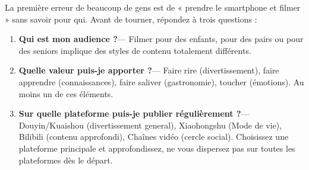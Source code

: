 


La première erreur de beaucoup de gens est de « prendre le smartphone et filmer » sans savoir pour qui. Avant de tourner, répondez à trois questions :

\begin{enumerate}
  \item \textbf{Qui est mon audience ?}— Filmer pour des enfants, pour des pairs ou pour des seniors implique des styles de contenu totalement différents.
  \item \textbf{Quelle valeur puis-je apporter ?}— Faire rire (divertissement), faire apprendre (connaissances), faire saliver (gastronomie), toucher (émotions). Au moins un de ces éléments.
  \item \textbf{Sur quelle plateforme puis-je publier régulièrement ?}— Douyin/Kuaishou (divertissement general), Xiaohongshu (Mode de vie), Bilibili (contenu approfondi), Chaînes vidéo (cercle social). Choisissez une plateforme principale et approfondissez, ne vous dispersez pas sur toutes les plateformes dès le départ.
\end{enumerate}


